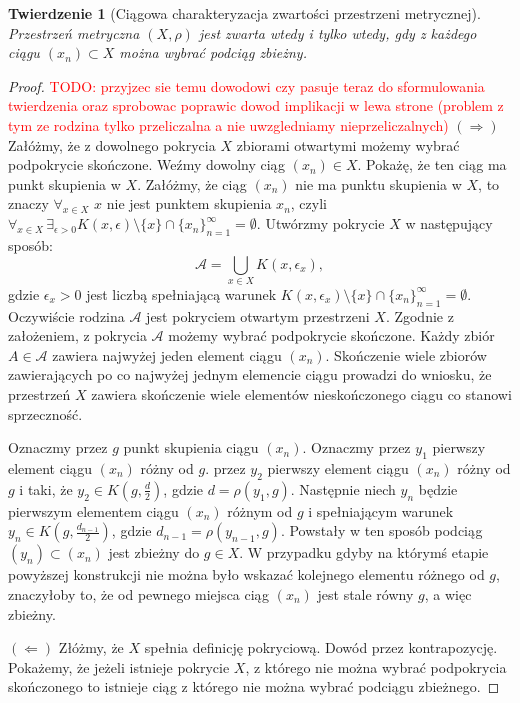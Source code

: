 \documentclass[licencjacka]{pwr_wmat_praca_dyplomowa}
\theoremstyle{plain}
\newtheorem{theorem}{Twierdzenie}
\numberwithin{theorem}{chapter}
\theoremstyle{definition}
\numberwithin{theorem}{chapter}
\begin{document}
\begin{theorem}[Ciągowa charakteryzacja zwartości przestrzeni metrycznej]
\label{rownowaznosc_definicji_pokryciowej_i_ciagowej}
Przestrzeń metryczna $(X, \rho)$ jest zwarta wtedy i tylko wtedy, gdy z każdego ciągu $(x_n) \subset X$ można wybrać podciąg zbieżny.
\end{theorem}

\begin{proof}
\textcolor{red}{TODO: przyjzec sie temu dowodowi czy pasuje teraz do sformulowania twierdzenia oraz sprobowac poprawic dowod  implikacji w lewa strone (problem z tym ze rodzina tylko przeliczalna a nie uwzgledniamy nieprzeliczalnych)}
$(\Rightarrow)$
Załóżmy, że z dowolnego pokrycia $X$ zbiorami otwartymi możemy wybrać podpokrycie skończone. Weźmy dowolny ciąg $(x_n) \in X$. Pokażę, że ten ciąg ma punkt skupienia w $X$. Załóżmy, że ciąg $(x_n)$ nie ma punktu skupienia w $X$, to znaczy $\forall_{x \in X}$ $x$ nie jest punktem skupienia $x_n$, czyli $\forall_{x \in X} \, \exists_{\epsilon > 0}  K(x, \epsilon) \setminus \{x\} \cap \{x_n\}_{n=1}^{\infty} = \emptyset$. Utwórzmy pokrycie $X$ w następujący sposób: $$\mathcal{A} = \bigcup_{x \in X} K(x, \epsilon_x),$$ gdzie $\epsilon_x > 0$ jest liczbą spełniającą warunek $K(x, \epsilon_x) \setminus \{x\} \cap \{x_n\}_{n=1}^{\infty} = \emptyset$. Oczywiście rodzina $\mathcal{A}$ jest pokryciem otwartym przestrzeni $X$. Zgodnie z założeniem, z pokrycia $\mathcal{A}$ możemy wybrać podpokrycie skończone. Każdy zbiór $A \in \mathcal{A}$ zawiera najwyżej jeden element ciągu $(x_n)$. Skończenie wiele zbiorów zawierających po co najwyżej jednym elemencie ciągu prowadzi do wniosku, że przestrzeń $X$ zawiera skończenie wiele elementów nieskończonego ciągu co stanowi sprzeczność.

Oznaczmy przez $g$ punkt skupienia ciągu $(x_n)$. Oznaczmy przez $y_1$ pierwszy element ciągu $(x_n)$ różny od $g$. przez $y_2$ pierwszy element ciągu $(x_n)$ różny od $g$ i taki, że $y_2 \in K(g, \frac{d}{2})$, gdzie $d = \rho(y_1, g)$.
Następnie niech $y_n$ będzie pierwszym elementem ciągu $(x_n)$ różnym od $g$ i spełniającym warunek $y_n \in K(g, \frac{d_{n-1}}{2})$, gdzie $d_{n-1} = \rho(y_{n-1}, g)$. Powstały w ten sposób podciąg $(y_n) \subset (x_n)$ jest zbieżny do $g \in X$. W przypadku gdyby na którymś etapie powyższej konstrukcji nie można było wskazać kolejnego elementu różnego od $g$, znaczyłoby to, że od pewnego miejsca ciąg $(x_n)$ jest stale równy $g$, a więc zbieżny.

$(\Leftarrow)$
Złóżmy, że $X$ spełnia definicję pokryciową.
Dowód przez kontrapozycję. Pokażemy, że jeżeli istnieje pokrycie $X$, z którego nie można wybrać podpokrycia skończonego to istnieje ciąg z którego nie można wybrać podciągu zbieżnego.


\end{proof}
\end{document}
